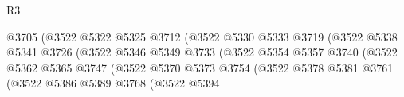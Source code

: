 \begin{lexlean}{R3}
\begin{coremodule}
                                                    @3705
                                                    (@3522
                                                      @5322
                                                      @5325
                                                      @3712
                                                      (@3522
                                                        @5330
                                                        @5333
                                                        @3719
                                                        (@3522
                                                          @5338
                                                          @5341
                                                          @3726
                                                          (@3522
                                                            @5346
                                                            @5349
                                                            @3733
                                                            (@3522
                                                              @5354
                                                              @5357
                                                              @3740
                                                              (@3522
                                                                @5362
                                                                @5365
                                                                @3747
                                                                (@3522
                                                                  @5370
                                                                  @5373
                                                                  @3754
                                                                  (@3522
                                                                    @5378
                                                                    @5381
                                                                    @3761
                                                                    (@3522
                                                                      @5386
                                                                      @5389
                                                                      @3768
                                                                      (@3522
                                                                        @5394

\end{coremodule}
\end{lexlean}
